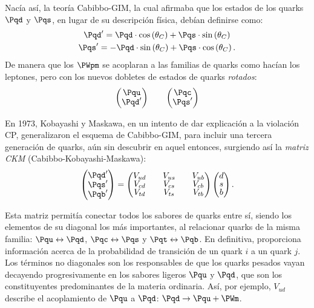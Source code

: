Nacía así, la teoría Cabibbo-GIM, la cual afirmaba que los estados de los quarks $\Pqd$ y $\Pqs$, en lugar de su descripción física, debían definirse como:
\begin{equation}
\begin{gathered}
\Pqd'=\Pqd \cdot \cos \left( \theta _{C}\right) + \Pqs \cdot \sin \left( \theta _{C}\right) \\
\Pqs'= - \Pqd \cdot \sin \left( \theta _{C}\right) + \Pqs \cdot \cos \left( \theta_C\right) .
\end{gathered}
\end{equation}
De manera que los $\PWpm$ se acoplaran a las familias de quarks como hacían los leptones, pero con los nuevos dobletes de estados de quarks \textit{rotados}:
\begin{align}
\begingroup 
\renewcommand*{\arraystretch}{0.8}
\setlength\arraycolsep{10pt}
\begin{pmatrix} \Pqu \\ \Pqd' \end{pmatrix} \qquad
\begin{pmatrix} \Pqc \\ \Pqs' \end{pmatrix}
\endgroup
\end{align}

En 1973, Kobayashi y Maskawa, en un intento de dar explicación a la violación CP, generalizaron el esquema de Cabibbo-GIM, para incluir una tercera generación de quarks, aún sin descubrir en aquel entonces, surgiendo así la \textit{matriz CKM} (Cabibbo-Kobayashi-Maskawa):
\begin{equation}
\begingroup 
\renewcommand*{\arraystretch}{0.8}
\setlength\arraycolsep{10pt}
\begin{pmatrix} \Pqd' \\ \Pqs' \\ \Pqb' \end{pmatrix} =\begin{pmatrix} V_{ud} & V_{us} & V_{ub} \\ V_{cd} & V_{cs} & V_{cb} \\ V_{td} & V_{ts} & V_{tb} \end{pmatrix}\begin{pmatrix} d \\ s \\ b \end{pmatrix} .
\endgroup\label{eq:CKM}
\end{equation}

Esta matriz permitía conectar todos los sabores de quarks entre sí, siendo los elementos de su diagonal los más importantes, al relacionar quarks de la misma familia: $\Pqu \leftrightarrow \Pqd$, $\Pqc \leftrightarrow \Pqs$ y $\Pqt \leftrightarrow \Pqb$. En definitiva, proporciona información acerca de la probabilidad de transición de un quark $i$ a un quark $j$. Los términos no diagonales son los responsables de que los quarks pesados vayan decayendo progresivamente en los sabores ligeros $\Pqu$ y $\Pqd$, que son los constituyentes predominantes de la materia ordinaria. Así, por ejemplo, $V_{ud}$ describe el acoplamiento de $\Pqu$ a $\Pqd$: $\Pqd \rightarrow \Pqu + \PWm$.

